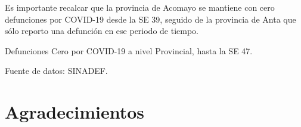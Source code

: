 \documentclass[12pt,a4paper,openany]{book}
\begin{document}
	Es importante recalcar que la provincia de Acomayo se mantiene con cero defunciones por COVID-19 desde la SE 39, seguido de la provincia de Anta que sólo reporto una defunción en ese periodo de tiempo. 
	\begin{table}[h]
		\caption{Defunciones Cero por COVID-19 a nivel Provincial, hasta la SE 47.}
		\resizebox{\textwidth}{!}{%
			
		}
		{\footnotesize {Fuente de datos: SINADEF.}}
	\end{table}
\pagebreak

	\section*{Agradecimientos}
		
\end{document}
